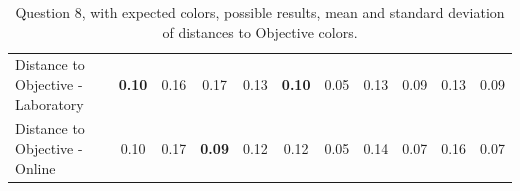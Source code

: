 \begin{table}[H]
{\begin{tabular}{lccccccccccccc}
    \multicolumn{4}{l}{Distance to Objective - Laboratory}                                                                                           & \multicolumn{1}{|c}{\textbf{0.10}}       & \multicolumn{1}{c|}{0.16}    & \multicolumn{1}{|c}{0.17}       & \multicolumn{1}{c|}{0.13}    & \multicolumn{1}{|c}{\textbf{0.10}}       & \multicolumn{1}{c|}{0.05}    & \multicolumn{1}{|c}{0.13}       & \multicolumn{1}{c|}{0.09}    & \multicolumn{1}{|c}{0.13}       & \multicolumn{1}{c|}{0.09}    \\
    \multicolumn{4}{l}{Distance to Objective - Online}                                                                                               & \multicolumn{1}{|c}{0.10}        & \multicolumn{1}{c|}{0.17}    & \multicolumn{1}{|c}{\textbf{0.09}}        & \multicolumn{1}{c|}{0.12}    & \multicolumn{1}{|c}{0.12}       & \multicolumn{1}{c|}{0.05}    & \multicolumn{1}{|c}{0.14}        & \multicolumn{1}{c|}{0.07}    & \multicolumn{1}{|c}{0.16}       & \multicolumn{1}{c|}{0.07}    \\ \hline
    \end{tabular}}
  \caption[Question 8, with expected Results.]{Question 8, with expected colors, possible results, mean and standard deviation of distances to Objective colors.}
  \label{table:lab_q8_expected}
\end{table}
%
